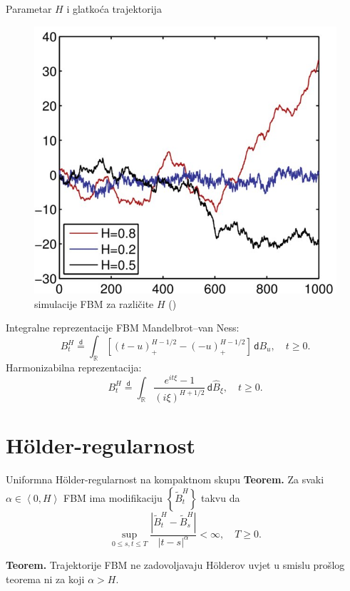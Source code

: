 \documentclass{beamer}
\renewcommand{\mathrm}[1]{\mathsf{#1}}
\newcommand{\D}{\,\mathrm d}
\newcommand{\jpod}{\stackrel{\mathrm d}{=}}
\newcommand{\wh}[1]{\widehat{#1}}
\newcommand{\wt}[1]{\widetilde{#1}}
\newcommand{\R}{\mathbb{R}}
\newcommand{\holder}{H\" older}
\newcommand{\abs}[1]{\left| {#1} \right|}
\begin{document}
\begin{frame}[plain]{Parametar \( H \) i glatkoća trajektorija}
\begin{figure}
\center
\includegraphics[scale=0.95]{fbm2.jpg}
\caption{\footnotesize simulacije FBM za različite \( H \) (\cite{fracizvor})}
\end{figure}
\end{frame}

\begin{frame}{Integralne reprezentacije FBM}
Mandelbrot--van Ness:
\begin{equation}
B^H_t \jpod \int_\R \left[ (t-u)_+^{H-1/2}-(-u)_+^{H-1/2} \right] \D B_u, \quad t \ge 0.
\end{equation}
\vskip20pt
Harmonizabilna reprezentacija:
\begin{equation}
B_t^H \jpod \int_\R \frac{e^{it\xi}-1}{(i\xi)^{H+1/2}} \D \wh B_\xi, \quad t \ge 0.
\end{equation}
\end{frame}

\section{\holder -regularnost}
\begin{frame}{Uniformna \holder-regularnost na kompaktnom skupu}
\textbf{Teorem.} Za svaki \( \alpha \in \left\langle0,H\right\rangle \) FBM ima modifikaciju 
\( \left\{ \wt B_t^H \right\} \) takvu da
\begin{equation}
\sup_{0 \le s,t \le T} \frac{\abs{\wt B_t^H - \wt B_s^H}}{\abs{t-s}^\alpha} < \infty, \quad T \ge 0.
\end{equation}

\vskip20pt
\textbf{Teorem.} Trajektorije FBM ne zadovoljavaju \holder ov uvjet u smislu prošlog teorema ni
za koji \( \alpha > H \).
\end{frame}
\end{document}

